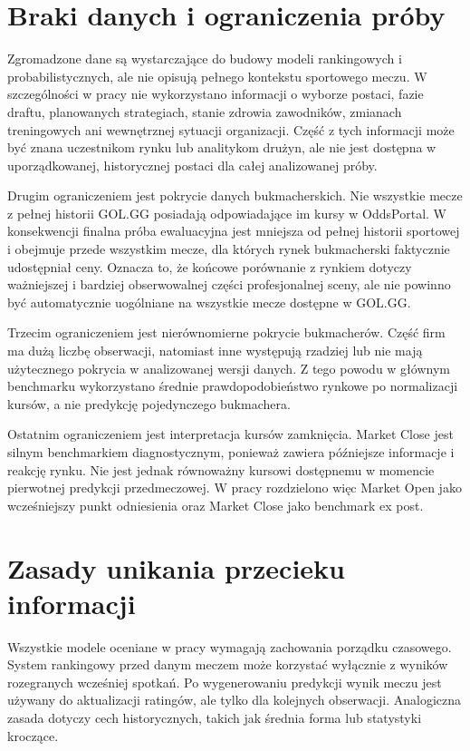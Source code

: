 \section{Braki danych i ograniczenia próby}

Zgromadzone dane są wystarczające do budowy modeli rankingowych i probabilistycznych, ale nie opisują pełnego kontekstu sportowego meczu. W szczególności w pracy nie wykorzystano informacji o wyborze postaci, fazie draftu, planowanych strategiach, stanie zdrowia zawodników, zmianach treningowych ani wewnętrznej sytuacji organizacji. Część z tych informacji może być znana uczestnikom rynku lub analitykom drużyn, ale nie jest dostępna w uporządkowanej, historycznej postaci dla całej analizowanej próby.

Drugim ograniczeniem jest pokrycie danych bukmacherskich. Nie wszystkie mecze z pełnej historii GOL.GG posiadają odpowiadające im kursy w OddsPortal. W konsekwencji finalna próba ewaluacyjna jest mniejsza od pełnej historii sportowej i obejmuje przede wszystkim mecze, dla których rynek bukmacherski faktycznie udostępniał ceny. Oznacza to, że końcowe porównanie z rynkiem dotyczy ważniejszej i bardziej obserwowalnej części profesjonalnej sceny, ale nie powinno być automatycznie uogólniane na wszystkie mecze dostępne w GOL.GG.

Trzecim ograniczeniem jest nierównomierne pokrycie bukmacherów. Część firm ma dużą liczbę obserwacji, natomiast inne występują rzadziej lub nie mają użytecznego pokrycia w analizowanej wersji danych. Z tego powodu w głównym benchmarku wykorzystano średnie prawdopodobieństwo rynkowe po normalizacji kursów, a nie predykcję pojedynczego bukmachera.

Ostatnim ograniczeniem jest interpretacja kursów zamknięcia. Market Close jest silnym benchmarkiem diagnostycznym, ponieważ zawiera późniejsze informacje i reakcję rynku. Nie jest jednak równoważny kursowi dostępnemu w momencie pierwotnej predykcji przedmeczowej. W pracy rozdzielono więc Market Open jako wcześniejszy punkt odniesienia oraz Market Close jako benchmark ex post.

\section{Zasady unikania przecieku informacji}

Wszystkie modele oceniane w pracy wymagają zachowania porządku czasowego. System rankingowy przed danym meczem może korzystać wyłącznie z wyników rozegranych wcześniej spotkań. Po wygenerowaniu predykcji wynik meczu jest używany do aktualizacji ratingów, ale tylko dla kolejnych obserwacji. Analogiczna zasada dotyczy cech historycznych, takich jak średnia forma lub statystyki kroczące.


